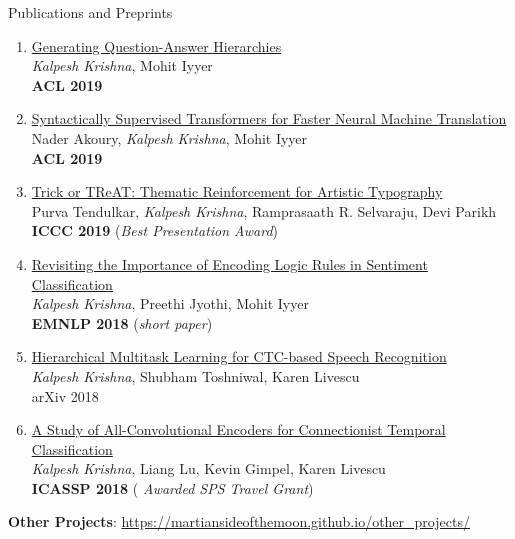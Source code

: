 \documentclass{resume} %
\begin{document}
\begin{rSection}{Publications and Preprints}
\begin{enumerate}[leftmargin=*]
\item \href{https://arxiv.org/abs/1906.02622}{Generating Question-Answer Hierarchies} \\ \textit{Kalpesh Krishna}, Mohit Iyyer \\ \textbf{ACL 2019}

\item \href{https://arxiv.org/abs/1906.02780}{Syntactically Supervised Transformers for Faster Neural Machine Translation} \\ Nader Akoury, \textit{Kalpesh Krishna}, Mohit Iyyer \\ \textbf{ACL 2019}
\item \href{https://arxiv.org/abs/1903.07820}{Trick or TReAT: Thematic Reinforcement for Artistic Typography} \\ Purva Tendulkar, \textit{Kalpesh Krishna}, Ramprasaath R. Selvaraju, Devi Parikh \\ \textbf{ICCC 2019} ({\textit{Best Presentation Award}})
\item \href{https://arxiv.org/abs/1808.07733}{Revisiting the Importance of Encoding Logic Rules in Sentiment Classification} \\ \textit{Kalpesh Krishna}, Preethi Jyothi, Mohit Iyyer \\ \textbf{EMNLP 2018} (\textit{short paper})
\item \href{https://arxiv.org/abs/1807.06234}{Hierarchical Multitask Learning for CTC-based Speech Recognition} \\ \textit{Kalpesh Krishna}, Shubham Toshniwal, Karen Livescu \\
arXiv 2018
\item \href{https://arxiv.org/abs/1710.10398}{A Study of All-Convolutional Encoders for Connectionist Temporal Classification}\\ \textit{Kalpesh Krishna}, Liang Lu, Kevin Gimpel,  Karen Livescu\\ \textbf{ICASSP 2018} ({ \textit{Awarded SPS Travel Grant}})
%
\end{enumerate}

\textbf{Other Projects}: \url{https://martiansideofthemoon.github.io/other_projects/}
\end{rSection}

\vspace{0.1in}
\end{document}
